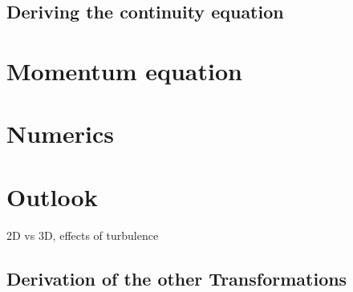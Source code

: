 \documentclass[12pt,a4paper,twoside]{article}
\begin{document}
\subsection{Deriving the continuity equation}
\label{sub:Deriving the continuity equation}

\section{Momentum equation}
\label{sec:Momentum equation}

\section{Numerics}
\label{sec:Numerics}

\section{Outlook}
\label{sec:Outlook}
2D vs 3D, effects of turbulence

\newpage
\begin{appendices}

\section{Derivation of the other Transformations}






\end{appendices}
\end{document}
